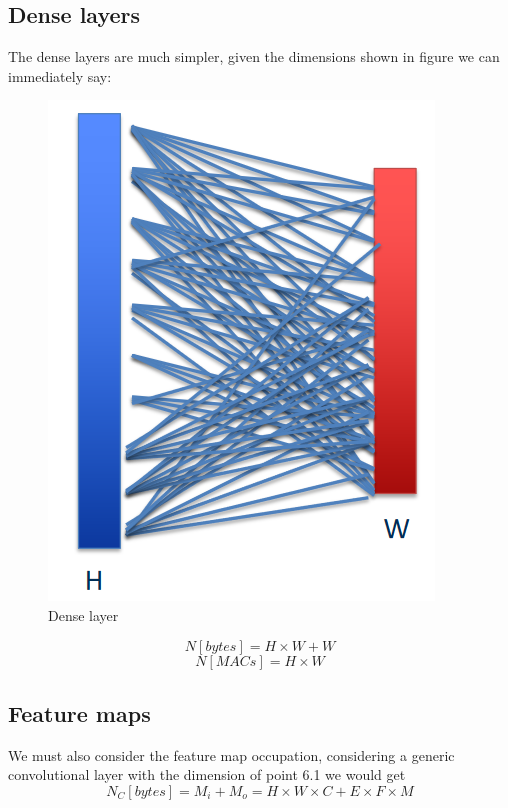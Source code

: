 \documentclass{article}
\begin{document}
    \subsection{Dense layers}
    The dense layers are much simpler, given the dimensions shown in figure we can immediately say:
      \begin{figure}[H]
        \includegraphics[scale=0.35]{../Images/DenseLayers.png}
        \centering
        \caption{Dense layer}
      \end{figure}

      \begin{equation}
        N [bytes] = H\times W + W
      \end{equation}
      \begin{equation}
        N [MACs] = H\times W
      \end{equation}

    \subsection{Feature maps}
      We must also consider the feature map occupation, considering a generic convolutional layer with the dimension of point 6.1 we would get
      \begin{equation}
        N_C [bytes] = M_i + M_o  = H\times W\times C + E\times F\times M
      \end{equation}
      
\end{document}
